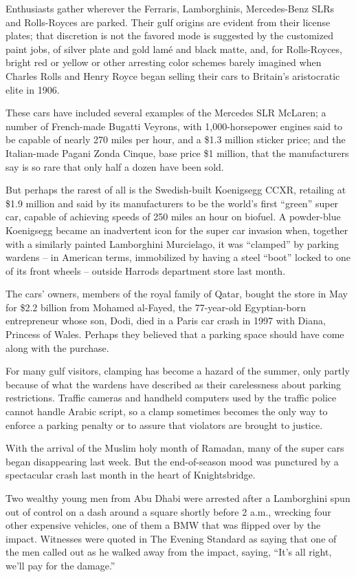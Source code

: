 ﻿\documentclass[12pt]{article}
\begin{document}
Enthusiasts gather wherever the Ferraris, Lamborghinis, Mercedes-Benz SLRs and Rolls-Royces are
parked. Their gulf origins are evident from their license plates; that discretion is not the favored
mode is suggested by the customized paint jobs, of silver plate and gold lam\'e and black matte,
and, for Rolls-Royces, bright red or yellow or other arresting color schemes barely imagined when
Charles Rolls and Henry Royce began selling their cars to Britain's aristocratic elite in 1906.

These cars have included several examples of the Mercedes SLR McLaren; a number of French-made
Bugatti Veyrons, with 1,000-horsepower engines said to be capable of nearly 270 miles per hour, and
a \$1.3 million sticker price; and the Italian-made Pagani Zonda Cinque, base price \$1 million,
that the manufacturers say is so rare that only half a dozen have been sold.

But perhaps the rarest of all is the Swedish-built Koenigsegg CCXR, retailing at \$1.9 million and
said by its manufacturers to be the world's first ``green'' super car, capable of achieving speeds
of 250 miles an hour on biofuel. A powder-blue Koenigsegg became an inadvertent icon for the super
car invasion when, together with a similarly painted Lamborghini Murcielago, it was ``clamped'' by
parking wardens -- in American terms, immobilized by having a steel ``boot'' locked to one of its
front wheels -- outside Harrods department store last month.

The cars' owners, members of the royal family of Qatar, bought the store in May for \$2.2 billion
from Mohamed al-Fayed, the 77-year-old Egyptian-born entrepreneur whose son, Dodi, died in a Paris
car crash in 1997 with Diana, Princess of Wales. Perhaps they believed that a parking space should
have come along with the purchase.

For many gulf visitors, clamping has become a hazard of the summer, only partly because of what the
wardens have described as their carelessness about parking restrictions. Traffic cameras and
handheld computers used by the traffic police cannot handle Arabic script, so a clamp sometimes
becomes the only way to enforce a parking penalty or to assure that violators are brought to
justice.

With the arrival of the Muslim holy month of Ramadan, many of the super cars began disappearing last
week. But the end-of-season mood was punctured by a spectacular crash last month in the heart of
Knightsbridge.

Two wealthy young men from Abu Dhabi were arrested after a Lamborghini spun out of control on a dash
around a square shortly before 2 a.m., wrecking four other expensive vehicles, one of them a BMW
that was flipped over by the impact. Witnesses were quoted in The Evening Standard as saying that
one of the men called out as he walked away from the impact, saying, ``It's all right, we'll pay for
the damage.''
\end{document}
